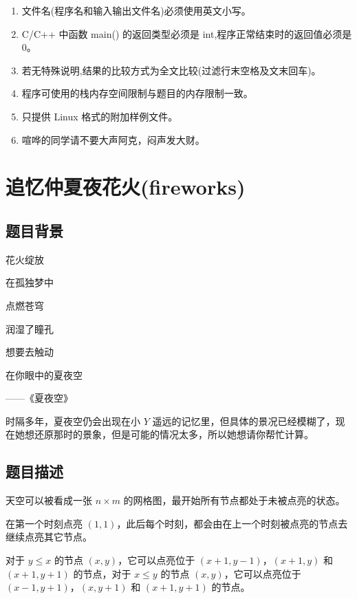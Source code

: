 \documentclass[12pt,a4paper,oneside]{ctexart}
\newcommand{\ChineseprobA}{追忆仲夏夜花火}
\newcommand{\probA}{fireworks}
\begin{document}
  \begin{enumerate}[topsep = 4pt]
    \setlength{\labelsep}{1.1em}
    \setlength{\itemsep}{2pt}
    \setlength{\parsep}{2pt}
    \setlength{\parskip}{2pt}
    \setlength{\itemindent}{.5em}
\item 文件名(程序名和输入输出文件名)必须使用英文小写。
\item  C/C++ 中函数 main() 的返回类型必须是 int,程序正常结束时的返回值必须是 0。
\item  若无特殊说明,结果的比较方式为全文比较(过滤行末空格及文末回车)。
\item  程序可使用的栈内存空间限制与题目的内存限制一致。
\item  只提供 Linux 格式的附加样例文件。
\item  喧哗的同学请不要大声阿克，闷声发大财。
  \end{enumerate}
  \thispagestyle{empty}
  \newpage
  \section{\rm \ChineseprobA (\probA)}
  
\subsection*{题目背景}
  
花火绽放

在孤独梦中

点燃苍穹

润湿了瞳孔

想要去触动

在你眼中的夏夜空

——《夏夜空》

时隔多年，夏夜空仍会出现在小 ${Y}$ 遥远的记忆里，但具体的景况已经模糊了，现在她想还原那时的景象，但是可能的情况太多，所以她想请你帮忙计算。

  \subsection*{题目描述}

  
天空可以被看成一张 $n \times m$ 的网格图，最开始所有节点都处于未被点亮的状态。

在第一个时刻点亮 $\left ( 1 , 1  \right ) $，此后每个时刻，都会由在上一个时刻被点亮的节点去继续点亮其它节点。

对于 $y \le x$ 的节点 $\left ( x , y  \right ) $，它可以点亮位于 $\left ( x+1,y-1  \right ) $，$\left ( x+1,y  \right ) $ 和 $\left ( x+1,y+1  \right ) $ 的节点，对于 $x \le y$ 的节点 $\left ( x , y  \right ) $，它可以点亮位于 $\left ( x-1,y+1  \right ) $，$\left ( x,y+1  \right ) $ 和 $\left ( x+1,y+1  \right ) $ 的节点。
\end{document}
